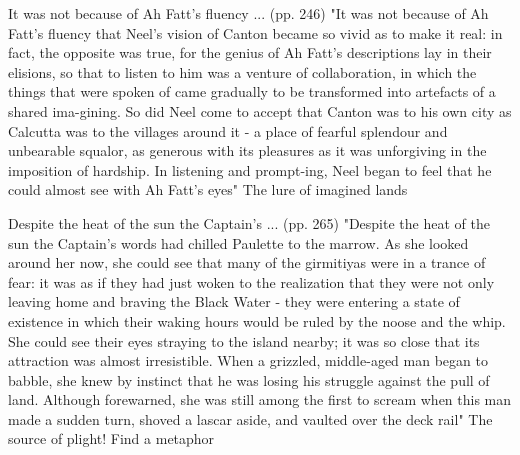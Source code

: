 It was not because of Ah Fatt’s fluency ... (pp. 246)
"It was not because of Ah Fatt’s fluency that Neel’s vision of Canton became so vivid as to make it real: in fact, the opposite was true, for the genius of Ah Fatt’s descriptions lay in their elisions, so that to listen to him was a venture of collaboration, in which the things that were spoken of came gradually to be transformed into artefacts of a shared ima-gining. So did Neel come to accept that Canton was to his own city as Calcutta was to the villages around it - a place of fearful splendour and unbearable squalor, as generous with its pleasures as it was unforgiving in the imposition of hardship. In listening and prompt-ing, Neel began to feel that he could almost see with Ah Fatt’s eyes"
The lure of imagined lands

Despite the heat of the sun the Captain’s ... (pp. 265)
"Despite the heat of the sun the Captain’s words had chilled Paulette to the marrow. As she looked around her now, she could see that many of the girmitiyas were in a trance of fear: it was as if they had just woken to the realization that they were not only leaving home and braving the Black Water - they were entering a state of existence in which their waking hours would be ruled by the noose and the whip. She could see their eyes straying to the island nearby; it was so close that its attraction was almost irresistible. When a grizzled, middle-aged man began to babble, she knew by instinct that he was losing his struggle against the pull of land. Although forewarned, she was still among the first to scream when this man made a sudden turn, shoved a lascar aside, and vaulted over the deck rail"
The source of plight! Find a metaphor